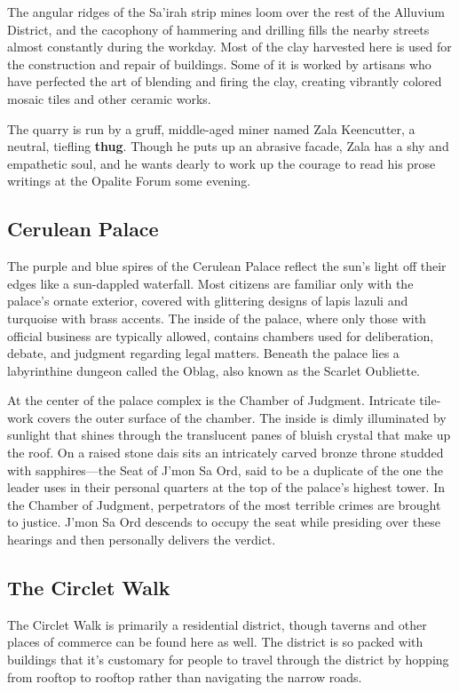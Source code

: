 \documentclass[letterpaper, 11pt, bg=full, twocolumn]{dndbook}
\begin{document}
The angular ridges of the Sa'irah strip mines loom over the rest of the Alluvium District, and the cacophony of hammering and drilling fills the nearby streets almost constantly during the workday. Most of the clay harvested here is used for the construction and repair of buildings. Some of it is worked by artisans who have perfected the art of blending and firing the clay, creating vibrantly colored mosaic tiles and other ceramic works.

The quarry is run by a gruff, middle-aged miner named Zala Keencutter, a neutral, tiefling \textbf{thug}. Though he puts up an abrasive facade, Zala has a shy and empathetic soul, and he wants dearly to work up the courage to read his prose writings at the Opalite Forum some evening.

\subsection{Cerulean Palace}

The purple and blue spires of the Cerulean Palace reflect the sun's light off their edges like a sun-dappled waterfall. Most citizens are familiar only with the palace's ornate exterior, covered with glittering designs of lapis lazuli and turquoise with brass accents. The inside of the palace, where only those with official business are typically allowed, contains chambers used for deliberation, debate, and judgment regarding legal matters. Beneath the palace lies a labyrinthine dungeon called the Oblag, also known as the Scarlet Oubliette.

At the center of the palace complex is the Chamber of Judgment. Intricate tile-work covers the outer surface of the chamber. The inside is dimly illuminated by sunlight that shines through the translucent panes of bluish crystal that make up the roof. On a raised stone dais sits an intricately carved bronze throne studded with sapphires---the Seat of J'mon Sa Ord, said to be a duplicate of the one the leader uses in their personal quarters at the top of the palace's highest tower. In the Chamber of Judgment, perpetrators of the most terrible crimes are brought to justice. J'mon Sa Ord descends to occupy the seat while presiding over these hearings and then personally delivers the verdict.

\subsection{The Circlet Walk}

The Circlet Walk is primarily a residential district, though taverns and other places of commerce can be found here as well. The district is so packed with buildings that it's customary for people to travel through the district by hopping from rooftop to rooftop rather than navigating the narrow roads.
\end{document}
